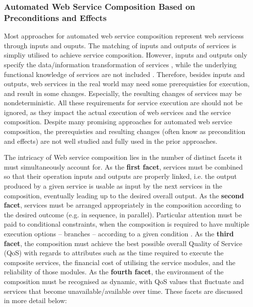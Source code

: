 \subsubsection{Automated Web Service Composition Based on Preconditions and Effects}

Most approaches for automated web service composition represent web servicess through inputs and ouputs. The matching of inputs and outputs of services is simpliy utilised to achieve service composition. However, inputs and outputs only specify the data/information transformation of services \cite{martin2004owl}, while the underlying functional knowledge of services are not included \cite{paliwal2012semantics}. Therefore, besides inputs and outputs, web services in the real world may need some prerequisties for execution, and result in some changes. Especially, the resulting changes of services may be nondeterministic. All these requirements for service execution are should not be ignored, as they impact the actual execution of web services and the service composition. Despite many promising approaches for automated web service composition, the prerequisties and resulting changes (often know as precondition and effects) are not well studied and fully used in the prior approaches. 






The intricacy of Web service composition lies in the number of distinct facets it must simultaneously account for. As the \textbf{first facet}, services must be combined so that their operation inputs and outputs are properly linked, i.e. the output produced by a given service is usable as input by the next services in the composition, eventually leading up to the desired overall output. As the \textbf{second facet}, services must be arranged appropriately in the composition according to the desired outcome (e.g. in sequence, in parallel). Particular attention must be paid to conditional constraints, when the composition is required to have multiple execution options -- branches -- according to a given condition \cite{wang2014automated,sohrabi2009web,karakoc2009composing}. As the \textbf{third facet}, the composition must achieve the best possible overall Quality of Service (QoS) with regards to attributes such as the time required to execute the composite services, the financial cost of utilising the service modules, and the reliability of those modules. As the \textbf{fourth facet}, the environment of the composition must be recognised as dynamic, with QoS values that fluctuate and services that become unavailable/available over time. These facets are discussed in more detail below:

